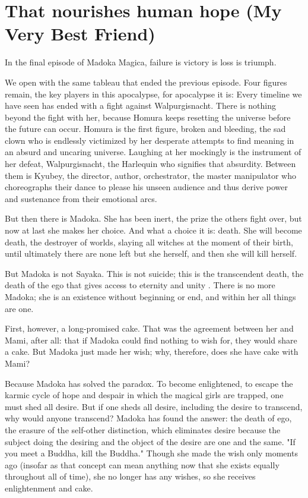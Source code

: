 \chapter{That nourishes human hope (My Very Best Friend)}
In the final episode of Madoka Magica, failure is victory is loss is triumph.

We open with the same tableau that ended the previous episode. Four figures remain, the key players in this apocalypse, for apocalypse it is: Every timeline we have seen has ended with a fight against Walpurgisnacht. There is nothing beyond the fight with her, because Homura keeps resetting the universe before the future can occur. Homura is the first figure, broken and bleeding, the sad clown who is endlessly victimized by her desperate attempts to find meaning in an absurd and uncaring universe. Laughing at her mockingly is the instrument of her defeat, Walpurgisnacht, the Harlequin who signifies that absurdity. Between them is Kyubey, the director, author, orchestrator, the master manipulator who choreographs their dance to please his unseen audience and thus derive power and sustenance from their emotional arcs.

But then there is Madoka. She has been inert, the prize the others fight over, but now at last she makes her choice. And what a choice it is: death. She will become death, the destroyer of worlds, slaying all witches at the moment of their birth, until ultimately there are none left but she herself, and then she will kill herself. 

But Madoka is not Sayaka. This is not suicide; this is the transcendent death, the death of the ego that gives access to eternity and unity \cite{ref87}. There is no more Madoka; she is an existence without beginning or end, and within her all things are one. 

First, however, a long-promised cake. That was the agreement between her and Mami, after all: that if Madoka could find nothing to wish for, they would share a cake. But Madoka just made her wish; why, therefore, does she have cake with Mami?

Because Madoka has solved the paradox. To become enlightened, to escape the karmic cycle of hope and despair in which the magical girls are trapped, one must shed all desire. But if one sheds all desire, including the desire to transcend, why would anyone transcend? Madoka has found the answer: the death of ego, the erasure of the self-other distinction, which eliminates desire because the subject doing the desiring and the object of the desire are one and the same. "If you meet a Buddha, kill the Buddha." \cite{ref88} Though she made the wish only moments ago (insofar as that concept can mean anything now that she exists equally throughout all of time), she no longer has any wishes, so she receives enlightenment and cake. 

